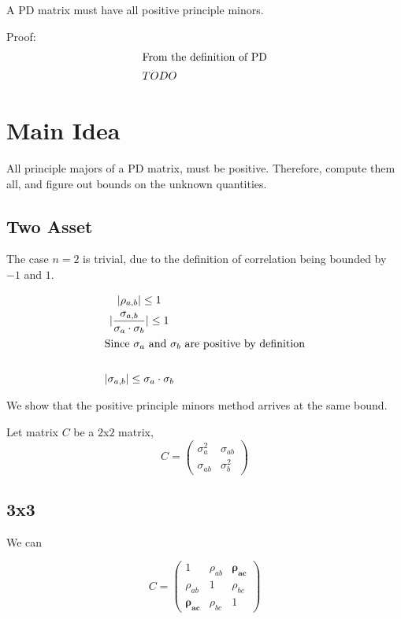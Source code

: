 \documentclass[a4paper]{article}
\begin{document}
\begin{theorem} \label{PD implies positive principle minors} 
A PD matrix must have all positive principle minors.

Proof:
\begin{gather*}
\shortintertext{From the definition of PD}
TODO
\end{gather*}
\end{theorem}

\section{Main Idea}\label{sec:main-idea}
All principle majors of a PD matrix, must be positive.
Therefore, compute them all, and figure out bounds on the unknown quantities.

\subsection{Two Asset}\label{subsec:two-asset}
The case $n=2$ is trivial, due to the definition of correlation being bounded by $-1$ and $1$.

\begin{gather*}
|\rho_{a,b}| \leq 1 \\
|\frac{\sigma_{a,b}}{\sigma_a \cdot \sigma_b}| \leq 1 \\
\shortintertext{Since $\sigma_a$ and $\sigma_b$ are positive by definition} \\
|\sigma_{a,b}| \leq \sigma_a \cdot \sigma_b
\end{gather*}

We show that the positive principle minors method arrives at the same bound. 

Let matrix $C$ be a $2$x$2$ matrix, 
\begin{equation}
C = \begin{pmatrix}
\sigma_a^2 & \sigma_{ab} \\
\sigma_{ab} & \sigma_b^2
\end{pmatrix}\label{eq:equation}
\end{equation}

\subsection{3x3}
We can  

\begin{equation}
C = \begin{pmatrix}
1 & \rho_{ab} & \mathbf{\rho_{ac}} \\
\rho_{ab} & 1 & \rho_{bc} \\
\mathbf{\rho_{ac}} & \rho_{bc} & 1
\end{pmatrix}
\end{equation}
\end{document}
